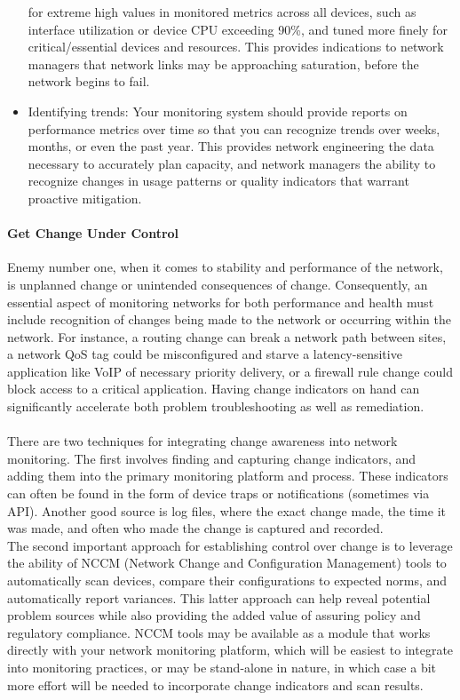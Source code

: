 \documentclass[8pt]{extarticle}
\begin{document}
\begin{multicols}{3}
\begin{itemize}
    for extreme high values in monitored metrics across all devices, such as interface utilization or
    device CPU exceeding 90\%, and tuned more finely for critical/essential devices and resources.
    This provides indications to network managers that network links may be approaching saturation,
    before the network begins to fail.
    \item Identifying trends: Your monitoring system should provide reports on performance metrics over
    time so that you can recognize trends over weeks, months, or even the past year. This provides
    network engineering the data necessary to accurately plan capacity, and network managers the
    ability to recognize changes in usage patterns or quality indicators that warrant proactive mitigation.
\end{itemize}

\paragraph{Get Change Under Control}
Enemy number one, when it comes to stability and performance of the
network, is unplanned change or unintended consequences of change.
Consequently, an essential aspect of monitoring networks for both
performance and health must include recognition of changes being made
to the network or occurring within the network. For instance, a routing
change can break a network path between sites, a network QoS tag could
be misconfigured and starve a latency-sensitive application like VoIP of
necessary priority delivery, or a firewall rule change could block access to
a critical application. Having change indicators on hand can significantly
accelerate both problem troubleshooting as well as remediation. \\
\\
There are two techniques for integrating change awareness into network monitoring. The first involves
finding and capturing change indicators, and adding them into the primary monitoring platform and
process. These indicators can often be found in the form of device traps or notifications (sometimes via
API). Another good source is log files, where the exact change made, the time it was made, and often
who made the change is captured and recorded. \\
The second important approach for establishing control over change is to leverage the ability of NCCM
(Network Change and Configuration Management) tools to automatically scan devices, compare their
configurations to expected norms, and automatically report variances. This latter approach can help
reveal potential problem sources while also providing the added value of assuring policy and regulatory
compliance. NCCM tools may be available as a module that works directly with your network monitoring
platform, which will be easiest to integrate into monitoring practices, or may be stand-alone in nature, in
which case a bit more effort will be needed to incorporate change indicators and scan results.

\end{multicols}
\end{document}
